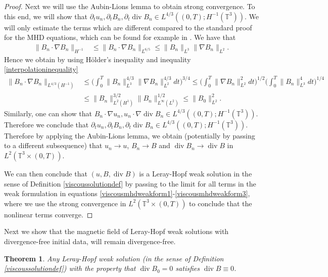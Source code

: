 \documentclass[12pt,a4paper]{article}
\newtheorem{theorem}{Theorem}[section]
\theoremstyle{definition}
\theoremstyle{remark}
\numberwithin{equation}{section}
\DeclareMathOperator{\Div}{div}
\begin{document}
\begin{proof}
Next we will use the Aubin-Lions lemma to obtain strong convergence. To this end, we will show that $\partial_t u_n , \partial_t B_n , \partial_t \Div B_n \in L^{4/3} ((0,T); H^{-1} (\mathbb{T}^3))$. We will only estimate the terms which are different compared to the standard proof for the MHD equations, which can be found for example in \cite[~Theorem 2.2]{wu}. We have that
\begin{align*}
\lVert B_n \cdot \nabla B_n \rVert_{H^{-1}} &\leq \lVert B_n \cdot \nabla B_n \rVert_{L^{6/5}} \leq \lVert B_n \rVert_{L^3} \lVert \nabla B_n \rVert_{L^2}.
\end{align*}
Hence we obtain by using Hölder's inequality and inequality \eqref{interpolationinequality}
\begin{align*}
\lVert B_n \cdot \nabla B_n \rVert_{L^{4/3} (H^{-1})} &\leq \bigg( \int_0^T \lVert B_n \rVert_{L^3}^{4/3} \lVert \nabla B_n \rVert_{L^2}^{4/3} dt \bigg)^{3/4} \leq \bigg( \int_0^T \lVert \nabla B_n \rVert_{L^2}^2 dt \bigg)^{1/2} \bigg( \int_0^T \lVert B_n \rVert_{L^3}^4 dt \bigg)^{1/4} \\
&\leq \lVert B_n \rVert_{L^2 (H^1)}^{3/2} \lVert B_n \rVert_{L^\infty (L^2)}^{1/2} \leq \lVert B_0 \rVert_{L^2}^2.
\end{align*}
Similarly, one can show that $B_n \cdot \nabla u_n, u_n \cdot \nabla \Div B_n \in L^{4/3} ((0,T); H^{-1} (\mathbb{T}^3))$. Therefore we conclude that $\partial_t u_n, \partial_t B_n, \partial_t \Div B_n \in L^{4/3} ((0,T); H^{-1} (\mathbb{T}^3))$. Therefore by applying the Aubin-Lions lemma, we obtain (potentially by passing to a different subsequence) that $u_n \rightarrow u$, $B_n \rightarrow B$ and $\Div B_n \rightarrow \Div B$ in $L^2 (\mathbb{T}^3 \times (0,T))$.

We can then conclude that $(u, B, \Div B)$ is a Leray-Hopf weak solution in the sense of Definition \ref{viscoussolutiondef} by passing to the limit for all terms in the weak formulation in equations \eqref{viscousmhdweakform1}-\eqref{viscousmhdweakform3}, where we use the strong convergence in $L^2 (\mathbb{T}^3 \times (0,T))$ to conclude that the nonlinear terms converge. 
\end{proof}
Next we show that the magnetic field of Leray-Hopf weak solutions with divergence-free initial data, will remain divergence-free.
\begin{theorem} \label{lerayhopfdivergence}
Any Leray-Hopf weak solution (in the sense of Definition \ref{viscoussolutiondef}) with the property that $\Div B_0 = 0$ satisfies $\Div B \equiv 0$.
\end{theorem}
\end{document}
